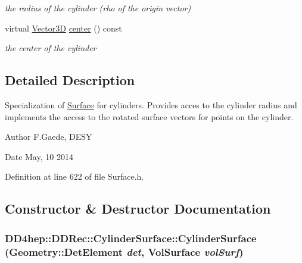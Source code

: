 \begin{DoxyCompactItemize}
\begin{DoxyCompactList}\small\item\em the radius of the cylinder (rho of the origin vector) \item\end{DoxyCompactList}\item 
virtual \hyperlink{class_d_d_surfaces_1_1_vector3_d}{Vector3D} \hyperlink{class_d_d4hep_1_1_d_d_rec_1_1_cylinder_surface_a2f781fa234e46d60caa6d07271c2e922}{center} () const 
\begin{DoxyCompactList}\small\item\em the center of the cylinder \item\end{DoxyCompactList}\end{DoxyCompactItemize}


\subsection{Detailed Description}
Specialization of \hyperlink{class_d_d4hep_1_1_d_d_rec_1_1_surface}{Surface} for cylinders. Provides acces to the cylinder radius and implements the access to the rotated surface vectors for points on the cylinder. \begin{DoxyAuthor}{Author}
F.Gaede, DESY 
\end{DoxyAuthor}
\begin{DoxyDate}{Date}
May, 10 2014 
\end{DoxyDate}


Definition at line 622 of file Surface.h.

\subsection{Constructor \& Destructor Documentation}
\hypertarget{class_d_d4hep_1_1_d_d_rec_1_1_cylinder_surface_a7820d49bdd82fe0e4c33dfa3953cd73a}{
\subsubsection[{CylinderSurface}]{\setlength{\rightskip}{0pt plus 5cm}DD4hep::DDRec::CylinderSurface::CylinderSurface ({\bf Geometry::DetElement} {\em det}, \/  {\bf VolSurface} {\em volSurf})}}
\label{class_d_d4hep_1_1_d_d_rec_1_1_cylinder_surface_a7820d49bdd82fe0e4c33dfa3953cd73a}


